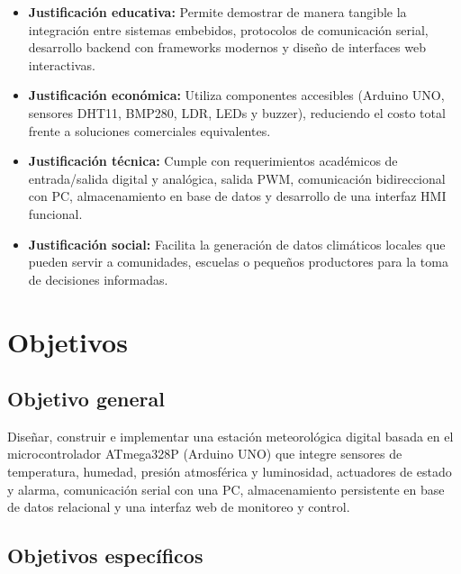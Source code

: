 \begin{itemize}[leftmargin=*]
    \item \textbf{Justificación educativa:} Permite demostrar de manera tangible la integración entre sistemas embebidos, protocolos de comunicación serial, desarrollo backend con frameworks modernos y diseño de interfaces web interactivas.
    \item \textbf{Justificación económica:} Utiliza componentes accesibles (Arduino UNO, sensores DHT11, BMP280, LDR, LEDs y buzzer), reduciendo el costo total frente a soluciones comerciales equivalentes.
    \item \textbf{Justificación técnica:} Cumple con requerimientos académicos de entrada/salida digital y analógica, salida PWM, comunicación bidireccional con PC, almacenamiento en base de datos y desarrollo de una interfaz HMI funcional.
    \item \textbf{Justificación social:} Facilita la generación de datos climáticos locales que pueden servir a comunidades, escuelas o pequeños productores para la toma de decisiones informadas.
\end{itemize}

\section{Objetivos}

\subsection{Objetivo general}

Diseñar, construir e implementar una estación meteorológica digital basada en el microcontrolador ATmega328P (Arduino UNO) que integre sensores de temperatura, humedad, presión atmosférica y luminosidad, actuadores de estado y alarma, comunicación serial con una PC, almacenamiento persistente en base de datos relacional y una interfaz web de monitoreo y control.

\subsection{Objetivos específicos}

